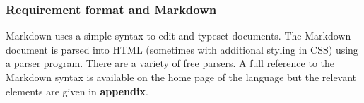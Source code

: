 \subsubsection{Requirement format and Markdown}
Markdown uses a simple syntax to edit and typeset documents. The Markdown
document is parsed into HTML (sometimes with additional styling in CSS) using a
parser program. There are a variety of free parsers. A full reference to the
Markdown syntax is available on the home page of the language but the relevant
elements are given in {\bf appendix}. %

